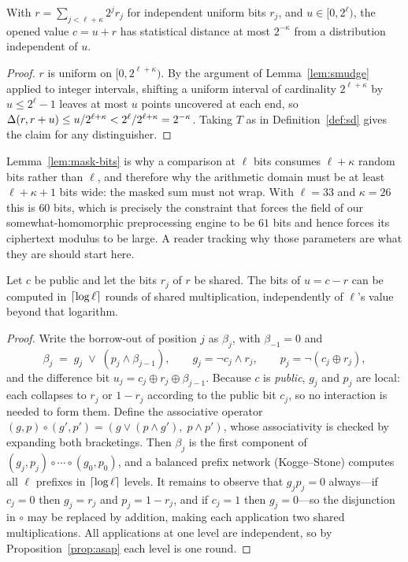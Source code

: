 \begin{lemma}
\label{lem:mask-bits}
With $r = \sum_{j<\ell+\kappa} 2^j r_j$ for independent uniform bits $r_j$, and
$u \in [0,2^{\ell})$, the opened value $c = u + r$ has statistical distance at most
$2^{-\kappa}$ from a distribution independent of $u$.
\end{lemma}

\begin{proof}
$r$ is uniform on $[0,2^{\ell+\kappa})$. By the argument of
Lemma~\ref{lem:smudge} applied to integer intervals, shifting a uniform interval
of cardinality $2^{\ell+\kappa}$ by $u \le 2^{\ell}-1$ leaves at most $u$ points
uncovered at each end, so
$\Delta(r, r+u) \le u/2^{\ell+\kappa} < 2^{\ell}/2^{\ell+\kappa} = 2^{-\kappa}$.
Taking $T$ as in Definition~\ref{def:sd} gives the claim for any distinguisher.
\end{proof}

\begin{remark}
\label{rem:kappa-cost}
Lemma~\ref{lem:mask-bits} is why a comparison at $\ell$ bits consumes
$\ell + \kappa$ random bits rather than $\ell$, and therefore why the arithmetic
domain must be at least $\ell + \kappa + 1$ bits wide: the masked sum must not
wrap. With $\ell = 33$ and $\kappa = 26$ this is $60$ bits, which is precisely the
constraint that forces the field of our somewhat-homomorphic preprocessing engine
to be $61$ bits and hence forces its ciphertext modulus to be large. A reader
tracking why those parameters are what they are should start here.
\end{remark}

\begin{theorem}
\label{thm:kogge}
Let $c$ be public and let the bits $r_j$ of $r$ be shared. The bits of
$u = c - r$ can be computed in $\left\lceil \log \ell \right\rceil$ rounds of shared
multiplication, independently of $\ell$'s value beyond that logarithm.
\end{theorem}

\begin{proof}
Write the borrow-out of position $j$ as $\beta_j$, with $\beta_{-1}=0$ and
\[
  \beta_j \;=\; g_j \;\vee\; (p_j \wedge \beta_{j-1}), \qquad
  g_j = \lnot c_j \wedge r_j, \qquad p_j = \lnot(c_j \oplus r_j),
\]
and the difference bit $u_j = c_j \oplus r_j \oplus \beta_{j-1}$. Because $c$ is
\emph{public}, $g_j$ and $p_j$ are local: each collapses to $r_j$ or $1-r_j$
according to the public bit $c_j$, so no interaction is needed to form them.
Define the associative operator
$(g,p)\circ(g',p') = (g \vee (p \wedge g'),\; p \wedge p')$, whose associativity
is checked by expanding both bracketings. Then $\beta_j$ is the first component
of $(g_j,p_j)\circ\cdots\circ(g_0,p_0)$, and a balanced prefix network
(Kogge--Stone) computes all $\ell$ prefixes in $\left\lceil \log \ell \right\rceil$ levels. It
remains to observe that $g_j p_j = 0$ always---if $c_j = 0$ then $g_j = r_j$ and
$p_j = 1-r_j$, and if $c_j = 1$ then $g_j = 0$---so the disjunction in $\circ$ may
be replaced by addition, making each application two shared multiplications. All
applications at one level are independent, so by Proposition~\ref{prop:asap} each
level is one round.
\end{proof}

